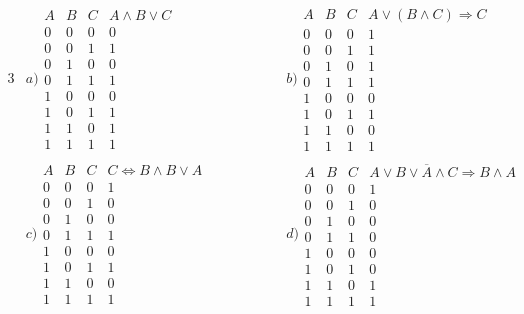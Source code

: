 \documentclass[12pt,a4paper,ngerman]{scrartcl}
\begin{document}
	\begin{alignat*}{3}
		&a) \begin{array}{ccc|c}
			A & B  & C & A \wedge B \vee C\\
			\hline
			0 & 0 & 0 & 0\\
			0 & 0 & 1 & 1\\
			0 & 1 & 0 & 0\\
			0 & 1 & 1 & 1\\
			1 & 0 & 0 & 0\\
			1 & 0 & 1 & 1\\
			1 & 1 & 0 & 1\\
			1 & 1 & 1 & 1
		\end{array}
		\qquad && \qquad
		b) \begin{array}{ccc|c}
			A & B  & C & A \vee (B \wedge C) \Rightarrow C\\
			\hline
			0 & 0 & 0 & 1\\
			0 & 0 & 1 & 1\\
			0 & 1 & 0 & 1\\
			0 & 1 & 1 & 1\\
			1 & 0 & 0 & 0\\
			1 & 0 & 1 & 1\\
			1 & 1 & 0 & 0\\
			1 & 1 & 1 & 1
		\end{array}\\
		&c) \begin{array}{ccc|c}
			A & B  & C & C \Leftrightarrow B \wedge B \vee A\\
			\hline
			0 & 0 & 0 & 1\\
			0 & 0 & 1 & 0\\
			0 & 1 & 0 & 0\\
			0 & 1 & 1 & 1\\
			1 & 0 & 0 & 0\\
			1 & 0 & 1 & 1\\
			1 & 1 & 0 & 0\\
			1 & 1 & 1 & 1
		\end{array}
		\qquad && \qquad
		d) \begin{array}{ccc|c}
			A & B  & C & A \vee B \vee \overline{A} \wedge C \Rightarrow B \wedge A\\
			\hline
			0 & 0 & 0 & 1\\
			0 & 0 & 1 & 0\\
			0 & 1 & 0 & 0\\
			0 & 1 & 1 & 0\\
			1 & 0 & 0 & 0\\
			1 & 0 & 1 & 0\\
			1 & 1 & 0 & 1\\
			1 & 1 & 1 & 1
		\end{array}
	\end{alignat*}
	
\end{document}
